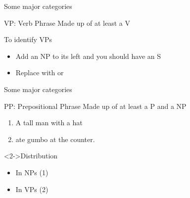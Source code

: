 \documentclass{beamer}
\newcommand{\subonetwo}{Some major categories}
\begin{document}
      \begin{frame}[t]{\subonetwo}
        \begin{block}{VP: Verb Phrase}
          Made up of at least a V
        \end{block}
        \begin{block}{To identify VPs}
          \begin{itemize}
            \item Add an NP to its left and you should have an S
            \item Replace with  or 
          \end{itemize}
        \end{block}
      \end{frame}

      \begin{frame}{\subonetwo}
        \begin{block}{PP: Prepositional Phrase}
          Made up of at least a P and a NP
        \end{block}
        \begin{example}
          \begin{enumerate}
            \item \only<2->{[NP }A tall man \only<2->{[PP }with a hat\only<2->{]]}
            \item \only<3->{[VP }ate gumbo \only<3->{[PP }at the counter.\only<3->{]]}
          \end{enumerate}
        \end{example}
        \begin{block}<2->{Distribution}
          \begin{itemize}
            \item<2-> In NPs (1)
            \item<3-> In VPs (2)
          \end{itemize}
        \end{block}
      \end{frame}
\end{document}
